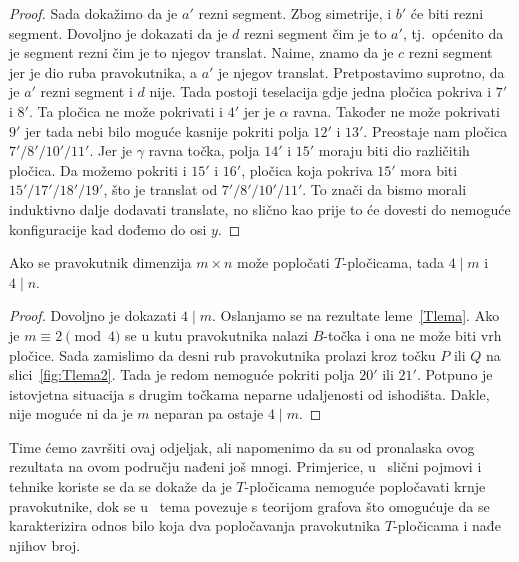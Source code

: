 \documentclass[11pt]{scrartcl}
\begin{document}
\begin{proof}
Sada dokažimo da je $a'$ rezni segment. Zbog simetrije, i $b'$ će biti rezni segment. Dovoljno je dokazati da je $d$ rezni segment čim je to $a'$, tj.\ općenito da je segment rezni čim je to njegov translat. Naime, znamo da je $c$ rezni segment jer je dio ruba pravokutnika, a $a'$ je njegov translat. Pretpostavimo suprotno, da je $a'$ rezni segment i $d$ nije. Tada postoji teselacija gdje jedna pločica pokriva i $7'$ i $8'$. Ta pločica ne može pokrivati i $4'$ jer je $\alpha$ ravna. Također ne može pokrivati $9'$ jer tada nebi bilo moguće kasnije pokriti polja $12'$ i $13'$. Preostaje nam pločica $7'/8'/10'/11'$. Jer je $\gamma$ ravna točka, polja $14'$ i $15'$ moraju biti dio različitih pločica. Da možemo pokriti i $15'$ i $16'$, pločica koja pokriva $15'$ mora biti $15'/17'/18'/19'$, što je translat od $7'/8'/10'/11'$. To znači da bismo morali induktivno dalje dodavati translate, no slično kao prije to će dovesti do nemoguće konfiguracije kad dođemo do osi $y$.
\end{proof}

\begin{teorem} \label{walkupteorem}
Ako se pravokutnik dimenzija $m \times n$ može popločati $T$-pločicama, tada $4 \mid m$ i $4 \mid n$.
\end{teorem}

\begin{proof}
Dovoljno je dokazati $4 \mid m$. Oslanjamo se na rezultate leme~\ref{Tlema}. Ako je $m \equiv 2 \pmod{4}$ se u kutu pravokutnika nalazi $B$-točka i ona ne može biti vrh pločice. Sada zamislimo da desni rub pravokutnika prolazi kroz točku $P$ ili $Q$ na slici~\ref{fig:Tlema2}. Tada je redom nemoguće pokriti polja $20'$ ili $21'$. Potpuno je istovjetna situacija s drugim točkama neparne udaljenosti od ishodišta. Dakle, nije moguće ni da je $m$ neparan pa ostaje $4 \mid m$.
\end{proof}

Time ćemo završiti ovaj odjeljak, ali napomenimo da su od pronalaska ovog rezultata na ovom području nađeni još mnogi. Primjerice, u~\cite{zhan} slični pojmovi i tehnike koriste se da se dokaže da je $T$-pločicama nemoguće popločavati krnje pravokutnike, dok se u~\cite{kornpak} tema povezuje s teorijom grafova što omogućuje da se karakterizira odnos bilo koja dva popločavanja pravokutnika $T$-pločicama i nađe njihov broj.
\end{document}
